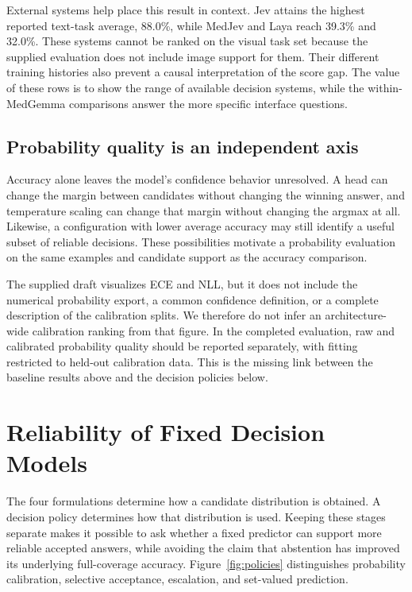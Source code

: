 
External systems help place this result in context. Jev attains the highest reported text-task average, 88.0\%, while MedJev and Laya reach 39.3\% and 32.0\%. These systems cannot be ranked on the visual task set because the supplied evaluation does not include image support for them. Their different training histories also prevent a causal interpretation of the score gap. The value of these rows is to show the range of available decision systems, while the within-MedGemma comparisons answer the more specific interface questions.

\subsection{Probability quality is an independent axis}

Accuracy alone leaves the model's confidence behavior unresolved. A head can change the margin between candidates without changing the winning answer, and temperature scaling can change that margin without changing the argmax at all. Likewise, a configuration with lower average accuracy may still identify a useful subset of reliable decisions. These possibilities motivate a probability evaluation on the same examples and candidate support as the accuracy comparison.

The supplied draft visualizes ECE and NLL, but it does not include the numerical probability export, a common confidence definition, or a complete description of the calibration splits. We therefore do not infer an architecture-wide calibration ranking from that figure. In the completed evaluation, raw and calibrated probability quality should be reported separately, with fitting restricted to held-out calibration data. This is the missing link between the baseline results above and the decision policies below.

\section{Reliability of Fixed Decision Models}
\label{sec:policies}

The four formulations determine how a candidate distribution is obtained. A decision policy determines how that distribution is used. Keeping these stages separate makes it possible to ask whether a fixed predictor can support more reliable accepted answers, while avoiding the claim that abstention has improved its underlying full-coverage accuracy. Figure~\ref{fig:policies} distinguishes probability calibration, selective acceptance, escalation, and set-valued prediction.

